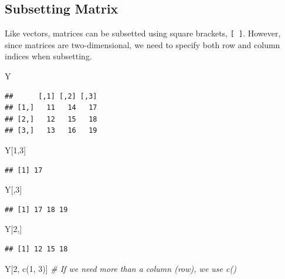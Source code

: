 \documentclass[
]{book}
\newenvironment{Shaded}{\begin{snugshade}}{\end{snugshade}}
\newcommand{\CommentTok}[1]{\textcolor[rgb]{0.56,0.35,0.01}{\textit{#1}}}
\newcommand{\DecValTok}[1]{\textcolor[rgb]{0.00,0.00,0.81}{#1}}
\newcommand{\FunctionTok}[1]{\textcolor[rgb]{0.00,0.00,0.00}{#1}}
\newcommand{\NormalTok}[1]{#1}
\begin{document}
\hypertarget{subsetting-matrix}{%
\subsection{Subsetting Matrix}\label{subsetting-matrix}}

Like vectors, matrices can be subsetted using square brackets, \texttt{{[}\ {]}}. However, since matrices are two-dimensional, we need to specify both row and column indices when subsetting.

\begin{Shaded}
\begin{Highlighting}[]
\NormalTok{Y}
\end{Highlighting}
\end{Shaded}

\begin{verbatim}
##      [,1] [,2] [,3]
## [1,]   11   14   17
## [2,]   12   15   18
## [3,]   13   16   19
\end{verbatim}

\begin{Shaded}
\begin{Highlighting}[]
\NormalTok{Y[}\DecValTok{1}\NormalTok{,}\DecValTok{3}\NormalTok{]}
\end{Highlighting}
\end{Shaded}

\begin{verbatim}
## [1] 17
\end{verbatim}

\begin{Shaded}
\begin{Highlighting}[]
\NormalTok{Y[,}\DecValTok{3}\NormalTok{]}
\end{Highlighting}
\end{Shaded}

\begin{verbatim}
## [1] 17 18 19
\end{verbatim}

\begin{Shaded}
\begin{Highlighting}[]
\NormalTok{Y[}\DecValTok{2}\NormalTok{,]}
\end{Highlighting}
\end{Shaded}

\begin{verbatim}
## [1] 12 15 18
\end{verbatim}

\begin{Shaded}
\begin{Highlighting}[]
\NormalTok{Y[}\DecValTok{2}\NormalTok{, }\FunctionTok{c}\NormalTok{(}\DecValTok{1}\NormalTok{, }\DecValTok{3}\NormalTok{)] }\CommentTok{\# If we need more than a column (row), we use c()}
\end{Highlighting}
\end{Shaded}
\end{document}
